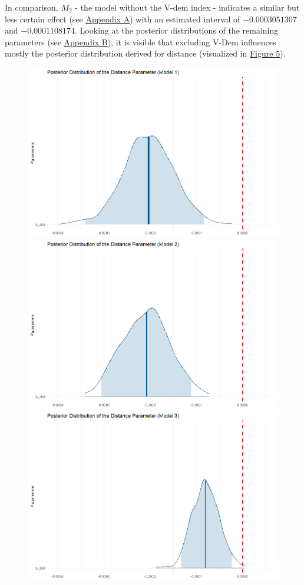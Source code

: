 \documentclass[12pt,a4paper]{article}
\begin{document}
In comparison, $M_2$ - the model without the V-dem index -  indicates a similar but less certain effect (see \hyperref[Appendix Tables]{\color{blue}Appendix A}) with an estimated interval of $-0.0003051307$ and $-0.0001108174$. Looking at the posterior distributions of the remaining parameters (see \hyperref[Appendix Figures]{\color{blue}Appendix B}), it is visible that excluding V-Dem influences mostly the posterior distribution derived for distance (visualized in \hyperref[F:5]{\color{blue}Figure 5}).

\begin{figure}[h]
\center
\label{F:5}
\includegraphics[scale=0.2]{PosteriorPlot_Distance_Model1.png}
\includegraphics[scale=0.2]{PosteriorPlot_Distance_Model2.png}
\includegraphics[scale=0.2]{PosteriorPlot_Distance_Model3.png}

\end{figure}
\end{document}
